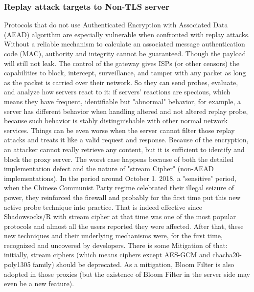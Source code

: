 \documentclass[conference]{IEEEtran}
\begin{document}
\subsubsection{Replay attack targets to Non-TLS server}
Protocols that do not use Authenticated Encryption with Associated Data (AEAD) algorithm are especially vulnerable when confronted with replay attacks. Without a reliable mechanism to calculate an associated message authentication code (MAC), authority and integrity cannot be guaranteed. Though the payload will still not leak.
The control of the gateway gives ISPs (or other censors) the capabilities to block, intercept, surveillance, and tamper with any packet as long as the packet is carried over their network. So they can send probes, evaluate, and analyze how servers react to it: if servers’ reactions are specious, which means they have frequent, identifiable but "abnormal" behavior, for example, a server has different behavior when handling altered and not altered replay probe, because such behavior is stably distinguishable with other normal network services. Things can be even worse when the server cannot filter those replay attacks and treats it like a valid request and response. Because of the encryption, an attacker cannot really retrieve any content, but it is sufficient to identify and block the proxy server\cite{Active_Probing}. The worst case happens because of both the detailed implementation defect and the nature of "stream Cipher" (non-AEAD implementations).
In the period around October 1. 2018, a "sensitive" period, when the Chinese Communist Party regime celebrated their illegal seizure of power, they reinforced the firewall and probably for the first time put this new active probe technique into practice. That is indeed effective since Shadowsocks/R with stream cipher at that time was one of the most popular protocols and almost all the users reported they were affected. After that, these new techniques and their underlying mechanisms were, for the first time, recognized and uncovered by developers.
There is some Mitigation of that: initially, stream ciphers (which means ciphers except AES-GCM and chacha20-poly1305 family) should be deprecated. As a mitigation, Bloom Filter is also adopted in those proxies (but the existence of Bloom Filter in the server side may even be a new feature).
\end{document}
